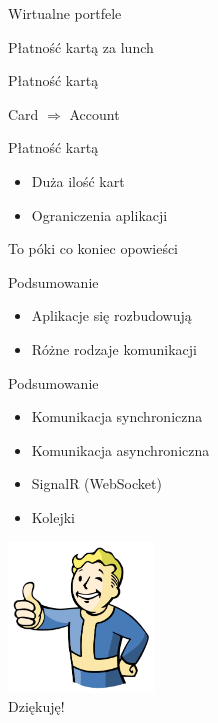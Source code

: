 \documentclass{beamer}
\begin{document}
\begin{frame}{Wirtualne portfele}
	\begin{center}
		\Huge{Płatność kartą za lunch}
	\end{center}
\end{frame}

\begin{frame}{Płatność kartą}
	\begin{center}
		\Huge{Card $\Rightarrow$ Account}
	\end{center}
\end{frame}

\begin{frame}{Płatność kartą}
	\begin{huge}
		\begin{itemize}
			\item Duża ilość kart
			\item Ograniczenia aplikacji
		\end{itemize}
	\end{huge}
\end{frame}

\begin{frame}{}
	\begin{center}
		\Huge{To póki co koniec opowieści}
	\end{center}
\end{frame}

\begin{frame}{Podsumowanie}
	\begin{huge}
		\begin{itemize}[<+->]
			\item Aplikacje się rozbudowują
			\item Różne rodzaje komunikacji
		\end{itemize}
	\end{huge}
\end{frame}

\begin{frame}{Podsumowanie}
	\begin{huge}
		\begin{itemize}[<+->]
			\item Komunikacja synchroniczna
			\item Komunikacja asynchroniczna
			\item SignalR (WebSocket)
			\item Kolejki
		\end{itemize}
	\end{huge}
\end{frame}

\begin{frame}{}
	\begin{center}
  		\includegraphics[height=4cm]{ok.png} \\
		\Huge{Dziękuję!}
	\end{center}
\end{frame}
\end{document}
